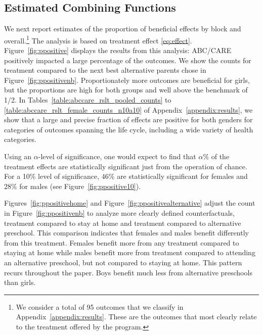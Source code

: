 \subsection{Estimated Combining Functions}

We next report estimates of the proportion of beneficial effects by block and overall.\footnote{We consider a total of 95 outcomes that we classify in Appendix~\ref{appendix:results}. These are the outcomes that most clearly relate to the treatment offered by the program.} The analysis is based on treatment effect \eqref{eq:effect}. Figure~\ref{fig:ppositive} displays the results from this analysis: ABC/CARE positively impacted a large percentage of the outcomes. We show the counts for treatment compared to the next best alternative parents chose in Figure~\ref{fig:ppositivenb}. Proportionately more outcomes are beneficial for girls, but the proportions are high for both groups and well above the benchmark of 1/2. In Tables~\ref{table:abccare_rslt_pooled_counts} to \ref{table:abccare_rslt_female_counts_n10a10} of Appendix~\ref{appendix:results}, we show that a large and precise fraction of effects are positive for both genders for categories of outcomes spanning the life cycle, including a wide variety of health categories.

Using an $\alpha$-level of significance, one would expect to find that $\alpha\%$ of the treatment effects are statistically significant just from the operation of chance. For a 10\% level of significance, $46\%$ are statistically significant for females and $28\%$ for males (see Figure~\ref{fig:ppositive10}).

Figures~\ref{fig:ppositivehome} and Figure~\ref{fig:ppositivealternative} adjust the count in Figure~\ref{fig:ppositivenb} to analyze more clearly defined counterfactuals, treatment compared to stay at home and treatment compared to alternative preschool. This comparison indicates that females and males benefit differently from this treatment. Females benefit more from any treatment compared to staying at home while males benefit more from treatment compared to attending an alternative preschool, but not compared to staying at home. This pattern recurs throughout the paper. Boys benefit much less from alternative preschools than girls.

